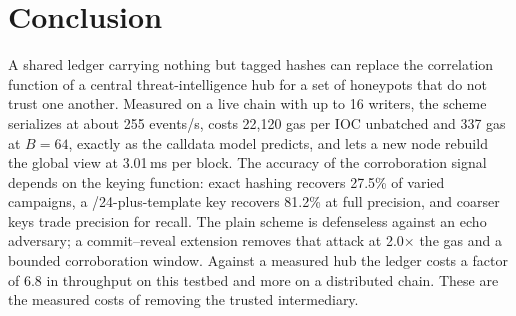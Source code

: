 \documentclass[conference]{IEEEtran}
\begin{document}
\section{Conclusion}
A shared ledger carrying nothing but tagged hashes can replace the correlation function of a central threat-intelligence hub for a set of honeypots that do not trust one another. Measured on a live chain with up to 16 writers, the scheme serializes at about 255 events/s, costs 22,120 gas per IOC unbatched and 337 gas at $B=64$, exactly as the calldata model predicts, and lets a new node rebuild the global view at 3.01\,ms per block. The accuracy of the corroboration signal depends on the keying function: exact hashing recovers 27.5\% of varied campaigns, a /24-plus-template key recovers 81.2\% at full precision, and coarser keys trade precision for recall. The plain scheme is defenseless against an echo adversary; a commit--reveal extension removes that attack at 2.0$\times$ the gas and a bounded corroboration window. Against a measured hub the ledger costs a factor of 6.8 in throughput on this testbed and more on a distributed chain. These are the measured costs of removing the trusted intermediary.
\end{document}
